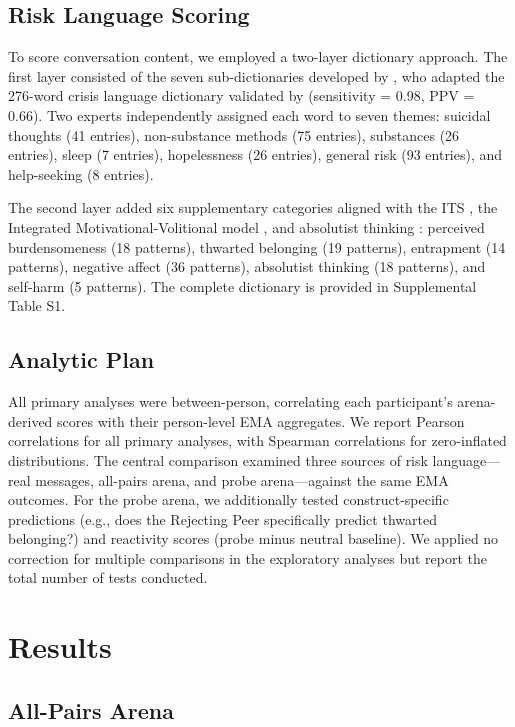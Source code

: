 \documentclass[review,12pt,authoryear]{elsarticle}
\begin{document}
\subsection{Risk Language Scoring}

To score conversation content, we employed a two-layer dictionary approach. The first layer consisted of the seven sub-dictionaries developed by \citet{ammerman2026dictionary}, who adapted the 276-word crisis language dictionary validated by \citet{swaminathan2023nlp} (sensitivity = 0.98, PPV = 0.66). Two experts independently assigned each word to seven themes: suicidal thoughts (41 entries), non-substance methods (75 entries), substances (26 entries), sleep (7 entries), hopelessness (26 entries), general risk (93 entries), and help-seeking (8 entries).

The second layer added six supplementary categories aligned with the ITS \citep{vanorden2010interpersonal}, the Integrated Motivational-Volitional model \citep{oconnor2011integrated}, and absolutist thinking \citep{almosaiwi2018absolute}: perceived burdensomeness (18 patterns), thwarted belonging (19 patterns), entrapment (14 patterns), negative affect (36 patterns), absolutist thinking (18 patterns), and self-harm (5 patterns). The complete dictionary is provided in Supplemental Table S1.

\subsection{Analytic Plan}

All primary analyses were between-person, correlating each participant's arena-derived scores with their person-level EMA aggregates. We report Pearson correlations for all primary analyses, with Spearman correlations for zero-inflated distributions. The central comparison examined three sources of risk language---real messages, all-pairs arena, and probe arena---against the same EMA outcomes. For the probe arena, we additionally tested construct-specific predictions (e.g., does the Rejecting Peer specifically predict thwarted belonging?) and reactivity scores (probe minus neutral baseline). We applied no correction for multiple comparisons in the exploratory analyses but report the total number of tests conducted.


\section{Results}

\subsection{All-Pairs Arena}
\end{document}
